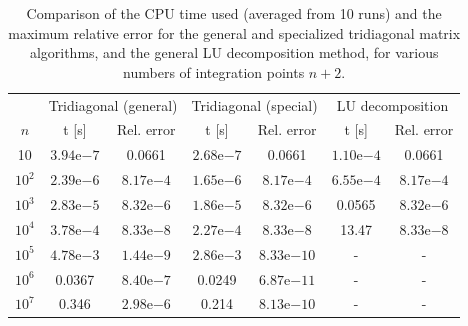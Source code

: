 \documentclass[a4paper,english]{article}
\begin{document}
\begin{table}[ht]
  \centering
  \begin{tabular}{c c c c c c c} \toprule
    & \multicolumn{2}{c}{Tridiagonal (general)} & \multicolumn{2}{c}{Tridiagonal (special)} & \multicolumn{2}{c}{LU decomposition}\\\cmidrule(lr){2-3} \cmidrule(lr){4-5} \cmidrule(lr){6-7}
    $n$ & t [s] & Rel. error & t [s] & Rel. error & t [s] & Rel. error \\\midrule
    10 & $3.94\mathrm{e}{-7}$ & 0.0661 & $2.68\mathrm{e}{-7}$ & 0.0661 & $1.10\mathrm{e}{-4}$ & 0.0661 \\
    $10^2$ & $2.39\mathrm{e}{-6}$ & $8.17\mathrm{e}{-4}$ & $1.65\mathrm{e}{-6}$ & $8.17\mathrm{e}{-4}$ & $6.55\mathrm{e}{-4}$ & $8.17\mathrm{e}{-4}$ \\
    $10^3$ & $2.83\mathrm{e}{-5}$ & $8.32\mathrm{e}{-6}$ & $1.86\mathrm{e}{-5}$ & $8.32\mathrm{e}{-6}$ & 0.0565 & $8.32\mathrm{e}{-6}$ \\
    $10^4$ & $3.78\mathrm{e}{-4}$ & $8.33\mathrm{e}{-8}$ & $2.27\mathrm{e}{-4}$ & $8.33\mathrm{e}{-8}$ & 13.47 & $8.33\mathrm{e}{-8}$ \\
    $10^5$ & $4.78\mathrm{e}{-3}$ & $1.44\mathrm{e}{-9}$ & $2.86\mathrm{e}{-3}$ & $8.33\mathrm{e}{-10}$ & - & - \\
    $10^6$ & 0.0367 & $8.40 \mathrm{e}{-7}$ & 0.0249 & $6.87 \mathrm{e}{-11}$ & - & - \\
    $10^7$ & 0.346 & $2.98 \mathrm{e}{-6}$ & 0.214 & $8.13 \mathrm{e}{-10}$ & - & - \\\bottomrule
  \end{tabular}
  \caption{Comparison of the CPU time used (averaged from 10 runs) and the maximum relative error for the general and specialized tridiagonal matrix algorithms, and the general LU decomposition method, for various numbers of integration points $n+2$.}
  \label{tab:mainresults}
\end{table}
\end{document}
